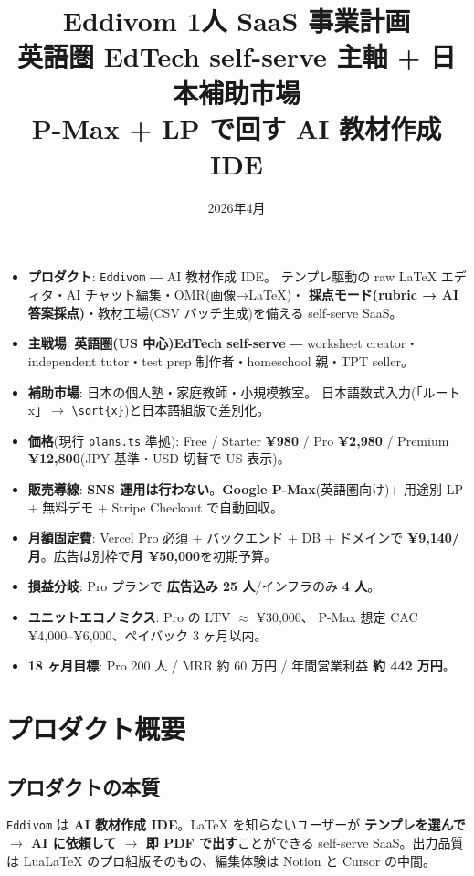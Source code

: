 \documentclass{article}
\title{\textbf{Eddivom 1人 SaaS 事業計画}\\\large
英語圏 EdTech self-serve 主軸 + 日本補助市場\\
P-Max + LP で回す AI 教材作成 IDE}
\author{}
\date{2026年4月}
\newcommand{\hl}[1]{\textcolor{cAlert}{\textbf{#1}}}
\begin{document}
\maketitle

\begin{tcolorbox}[colback=blue!5,colframe=blue!50!black,title=\textbf{エグゼクティブサマリ}]
\begin{itemize}[leftmargin=1.4em,itemsep=3pt]
  \item \textbf{プロダクト}: \texttt{Eddivom} ― AI 教材作成 IDE。
        テンプレ駆動の raw LaTeX エディタ・AI チャット編集・OMR(画像→LaTeX)・
        \hl{採点モード(rubric → AI 答案採点)}・教材工場(CSV バッチ生成)を備える self-serve SaaS。
  \item \textbf{主戦場}: \hl{英語圏(US 中心)EdTech self-serve} ―
        worksheet creator・independent tutor・test prep 制作者・homeschool 親・TPT seller。
  \item \textbf{補助市場}: 日本の個人塾・家庭教師・小規模教室。
        日本語数式入力(「ルートx」$\to$ \verb|\sqrt{x}|)と日本語組版で差別化。
  \item \textbf{価格}(現行 \texttt{plans.ts} 準拠): Free / Starter \textbf{¥980} /
        Pro \hl{¥2,980} / Premium \textbf{¥12,800}(JPY 基準・USD 切替で US 表示)。
  \item \textbf{販売導線}: \hl{SNS 運用は行わない}。\hl{Google P-Max}(英語圏向け)+
        用途別 LP + 無料デモ + Stripe Checkout で自動回収。
  \item \textbf{月額固定費}: Vercel Pro 必須 + バックエンド + DB + ドメインで
        \hl{¥9,140/月}。広告は別枠で\textbf{月 ¥50,000}を初期予算。
  \item \textbf{損益分岐}: Pro プランで \hl{広告込み 25 人}/インフラのみ \textbf{4 人}。
  \item \textbf{ユニットエコノミクス}: Pro の LTV $\approx$ ¥30,000、
        P-Max 想定 CAC ¥4,000--¥6,000、ペイバック 3 ヶ月以内。
  \item \textbf{18 ヶ月目標}: Pro 200 人 / MRR 約 60 万円 / 年間営業利益 \hl{約 442 万円}。
\end{itemize}
\end{tcolorbox}

\section{プロダクト概要}

\subsection*{プロダクトの本質}
\texttt{Eddivom} は \hl{AI 教材作成 IDE}。LaTeX を知らないユーザーが
\textbf{テンプレを選んで $\to$ AI に依頼して $\to$ 即 PDF で出す}ことができる
self-serve SaaS。出力品質は LuaLaTeX のプロ組版そのもの、編集体験は
Notion と Cursor の中間。
\end{document}
